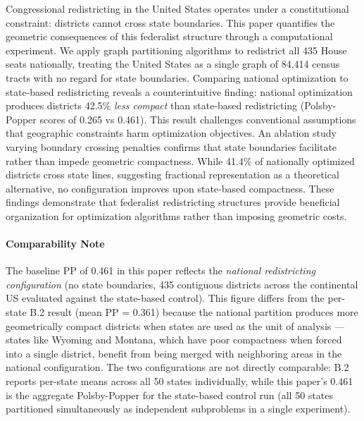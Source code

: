 
Congressional redistricting in the United States operates under a constitutional constraint: districts cannot cross state boundaries. This paper quantifies the geometric consequences of this federalist structure through a computational experiment. We apply graph partitioning algorithms to redistrict all 435 House seats nationally, treating the United States as a single graph of 84,414 census tracts with no regard for state boundaries. Comparing national optimization to state-based redistricting reveals a counterintuitive finding: national optimization produces districts 42.5\% \textit{less compact} than state-based redistricting (Polsby-Popper scores of 0.265 vs 0.461). This result challenges conventional assumptions that geographic constraints harm optimization objectives. An ablation study varying boundary crossing penalties confirms that state boundaries facilitate rather than impede geometric compactness. While 41.4\% of nationally optimized districts cross state lines, suggesting fractional representation as a theoretical alternative, no configuration improves upon state-based compactness. These findings demonstrate that federalist redistricting structures provide beneficial organization for optimization algorithms rather than imposing geometric costs.

\paragraph{Comparability Note} The baseline PP of 0.461 in this paper reflects the \textit{national redistricting configuration} (no state boundaries, 435 contiguous districts across the continental US evaluated against the state-based control). This figure differs from the per-state B.2 result (mean PP = 0.361) because the national partition produces more geometrically compact districts when states are used as the unit of analysis --- states like Wyoming and Montana, which have poor compactness when forced into a single district, benefit from being merged with neighboring areas in the national configuration. The two configurations are not directly comparable: B.2 reports per-state means across all 50 states individually, while this paper's 0.461 is the aggregate Polsby-Popper for the state-based control run (all 50 states partitioned simultaneously as independent subproblems in a single experiment).
